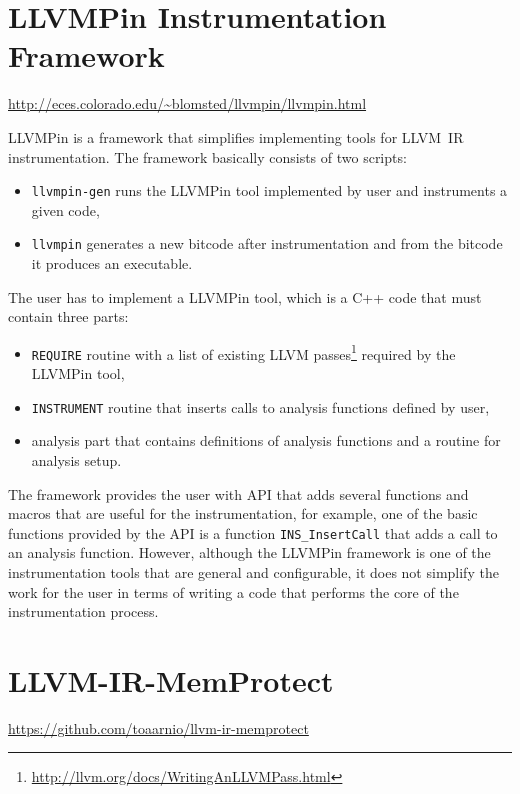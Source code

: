 \section{LLVMPin Instrumentation Framework}

\url{http://eces.colorado.edu/~blomsted/llvmpin/llvmpin.html}
\medskip

LLVMPin is a framework that simplifies implementing tools for LLVM~IR
instrumentation. The framework basically consists of two scripts:

\begin{itemize}
    \item \texttt{llvmpin-gen} runs the LLVMPin tool implemented by
          user and instruments a given code,
    \item \texttt{llvmpin} generates a new
	  bitcode after instrumentation and from the bitcode it produces an
          executable.
\end{itemize}

The user has to implement a LLVMPin tool, which is a C++ code that must contain three
parts:

\begin{itemize}
    \item \texttt{REQUIRE} routine with a list of existing LLVM
          passes\footnote{\url{http://llvm.org/docs/WritingAnLLVMPass.html}} required by
          the LLVMPin tool,
    \item \texttt{INSTRUMENT} routine that inserts calls to analysis functions
          defined by user,
    \item analysis part that contains definitions of analysis functions and a
          routine for analysis setup.
\end{itemize}

The framework provides the user with API that adds several functions and macros
that are useful for the instrumentation, for example, one of the basic
functions provided by the API is a function \texttt{INS\_InsertCall} that adds
a call to an analysis function. However, although the LLVMPin framework is one
of the instrumentation tools that are general and configurable, it does not
simplify the work for the user in terms of writing a code that performs the
core of the instrumentation process.


\section{LLVM-IR-MemProtect}

\url{https://github.com/toaarnio/llvm-ir-memprotect}

